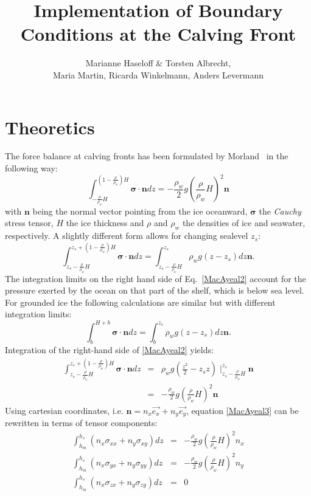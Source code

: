 \documentclass[a4paper,10pt]{article}
\title{Implementation of Boundary Conditions at the Calving Front}
\author{Marianne Haseloff \& Torsten Albrecht,\\ Maria Martin, Ricarda Winkelmann, Anders Levermann}
\begin{document}
\maketitle
\section{Theoretics}
The force balance at calving fronts has been formulated by Morland~\cite{Morland87} in the following way:
\begin{equation}%
\int_{-\frac{\rho}{\rho_w}H}^{(1-\frac{\rho}{\rho_w})H}\mathbf{\sigma}\cdot\mathbf{n}dz = -\frac{\rho_w}{2}g\left(\frac{\rho}{\rho_w}H \right)^2\mathbf{n}
\label{MacAyeal1}
\end{equation}
with $\mathbf{n}$ being the normal vector pointing from the ice
oceanward, $\mathbf{\sigma}$ the \emph{Cauchy} stress tensor, $H$ the ice thickness and $\rho$ and $\rho_{w}$ the densities of ice and seawater, respectively. A slightly different form allows for changing sealevel $z_s$:
\begin{equation}
\int_{z_s-\frac{\rho}{\rho_w}H}^{z_s+(1-\frac{\rho}{\rho_w})H}\mathbf{\sigma}\cdot\mathbf{n}dz = \int_{z_s-\frac{\rho}{\rho_w}H}^{z_s}\rho_w g (z-z_s) dz\mathbf{n}.
\label{MacAyeal2}
\end{equation}
The integration limits on the right hand side of Eq.~\eqref{MacAyeal2} account for the pressure exerted by the ocean on that part of the shelf, which is below sea level. For grounded ice the following calculations are similar but with different integration limits:
\begin{equation}
\int_{b}^{H+b}\mathbf{\sigma}\cdot\mathbf{n}dz = \int_{b}^{z_s}\rho_w g (z-z_s) dz\mathbf{n}.
\label{BC_sheet}
\end{equation}
Integration of the right-hand side of \eqref{MacAyeal2} yields:
\begin{eqnarray}
\int_{z_s-\frac{\rho}{\rho_w}H}^{z_s+(1-\frac{\rho}{\rho_w})H}\mathbf{\sigma}\cdot\mathbf{n}dz & = & \rho_w g \left(\frac{z^2}{2}-z_s z\right)\mid_{z_s-\frac{\rho}{\rho_w}H}^{z_s}\mathbf{n} \\
& = &  -\frac{\rho_w}{2}g\left(\frac{\rho}{\rho_w}H \right)^2\mathbf{n}  \label{MacAyeal3}
\end{eqnarray}
\noindent Using cartesian coordinates,
i.e. $\mathbf{n}=n_x\overrightarrow{e_x}+n_y\overrightarrow{e_y}$, equation
\eqref{MacAyeal3} can be rewritten in terms of tensor components:
\begin{eqnarray*}
\int_{h_m}^{h_s}(n_x\sigma_{xx}+n_y\sigma_{xy})dz & = & -\frac{\rho_w}{2}g\left(\frac{\rho}{\rho_w}H\right)^2n_x  \\
\int_{h_m}^{h_s}(n_x\sigma_{yx}+n_y\sigma_{yy})dz & = & -\frac{\rho_w}{2}g\left(\frac{\rho}{\rho_w}H\right)^2n_y  \\
\int_{h_m}^{h_s}(n_x\sigma_{zx}+n_y\sigma_{zy})dz & = & 0
\end{eqnarray*}
\end{document}
